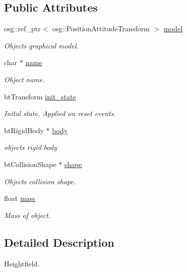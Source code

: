 \subsection*{Public Attributes}
\begin{DoxyCompactItemize}
\item 
osg\+::ref\+\_\+ptr$<$ osg\+::\+Position\+Attitude\+Transform $>$ \mbox{\hyperlink{classbtosgObject_afd15726e7a214212d6d5815f8ac1ac6c}{model}}
\begin{DoxyCompactList}\small\item\em Object\textquotesingle{}s graphical model. \end{DoxyCompactList}\item 
char $\ast$ \mbox{\hyperlink{classbtosgObject_a12396e1362797a75473a2e833b579cc9}{name}}
\begin{DoxyCompactList}\small\item\em Object name. \end{DoxyCompactList}\item 
bt\+Transform \mbox{\hyperlink{classbtosgObject_a2dee023f311114e200df9b04c8c1b400}{init\+\_\+state}}
\begin{DoxyCompactList}\small\item\em Inital state. Applied on reset events. \end{DoxyCompactList}\item 
bt\+Rigid\+Body $\ast$ \mbox{\hyperlink{classbtosgObject_a64ccde0543c184ed1749fdb9c9699785}{body}}
\begin{DoxyCompactList}\small\item\em object\textquotesingle{}s rigid body \end{DoxyCompactList}\item 
bt\+Collision\+Shape $\ast$ \mbox{\hyperlink{classbtosgObject_a0f6a8da01cf643c321bffe86e42604b0}{shape}}
\begin{DoxyCompactList}\small\item\em Object\textquotesingle{}s collision shape. \end{DoxyCompactList}\item 
float \mbox{\hyperlink{classbtosgObject_a2418bb2194d5e9b0f1c51c84672ba7d1}{mass}}
\begin{DoxyCompactList}\small\item\em Mass of object. \end{DoxyCompactList}\end{DoxyCompactItemize}


\subsection{Detailed Description}
Heightfield. 

